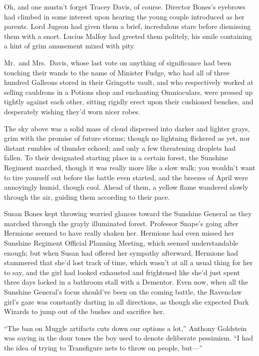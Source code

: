 Oh, and one mustn’t forget Tracey Davis, of course. Director
Bones’s eyebrows had climbed in some interest upon hearing the
young couple introduced as her parents. Lord Jugson had given them
a brief, incredulous stare before dismissing them with a snort.
Lucius Malfoy had greeted them politely, his smile containing a
hint of grim amusement mixed with pity.

Mr.~and Mrs.~Davis, whose last vote on anything of significance
had been touching their wands to the name of Minister Fudge, who
had all of three hundred Galleons stored in their Gringotts vault,
and who respectively worked at selling cauldrons in a Potions shop
and enchanting Omnioculars, were pressed up tightly against each
other, sitting rigidly erect upon their cushioned benches, and
desperately wishing they’d worn nicer robes.

The sky above was a solid mass of cloud dispersed into darker
and lighter grays, grim with the promise of future storms; though
no lightning flickered as yet, nor distant rumbles of thunder
echoed; and only a few threatening droplets had fallen.
\sbreak
To their designated starting place in a certain forest, the
Sunshine Regiment marched, though it was really more like a slow
walk; you wouldn’t want to tire yourself out before the battle even
started, and the breezes of April were annoyingly humid, though
cool. Ahead of them, a yellow flame wandered slowly through the
air, guiding them according to their pace.

Susan Bones kept throwing worried glances toward the Sunshine
General as they marched through the grayly illuminated forest.
Professor Snape’s going after Hermione seemed to have really shaken
her. Hermione had even missed her Sunshine Regiment Official
Planning Meeting, which seemed understandable enough; but when
Susan had offered her sympathy afterward, Hermione had stammered
that she’d lost track of time, which wasn’t at all a usual thing
for her to say, and the girl had looked exhausted and frightened
like she’d just spent three days locked in a bathroom stall with a
Dementor. Even now, when all the Sunshine General’s focus should’ve
been on the coming battle, the Ravenclaw girl’s gaze was constantly
darting in all directions, as though she expected Dark Wizards to
jump out of the bushes and sacrifice her.

“The ban on Muggle artifacts cuts down our options a lot,”
Anthony Goldstein was saying in the dour tones the boy used to
denote deliberate pessimism. “I had the idea of trying to
Transfigure nets to throw on people, but—”

